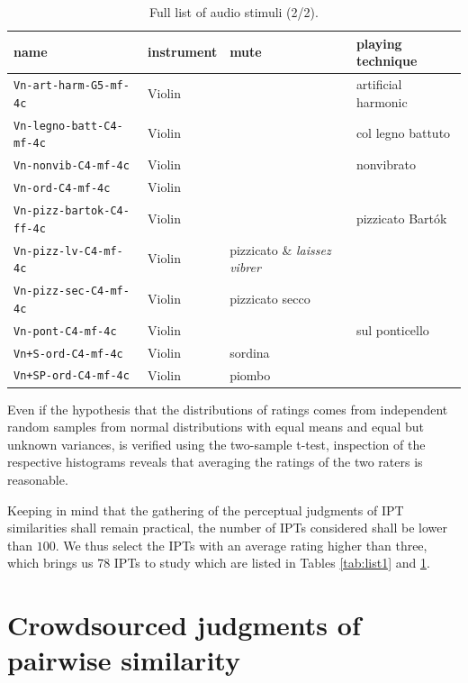 \documentclass{bmcart}
\newcommand{\ipt}{IPT\xspace}
\newcommand{\ipts}{IPTs\xspace}
\begin{document}
\begin{backmatter}
\begin{table}
  \label{tab:list2}
\caption{Full list of audio stimuli (2/2).}
\begin{tabular}{llll}
          name & instrument  & mute   &  playing technique \\ \hline \hline
          \texttt{Vn-art-harm-G5-mf-4c} & Violin & & artificial harmonic \\
          \texttt{Vn-legno-batt-C4-mf-4c} & Violin & & col legno battuto \\
          \texttt{Vn-nonvib-C4-mf-4c} & Violin & & nonvibrato \\
          \texttt{Vn-ord-C4-mf-4c} & Violin & & \\
          \texttt{Vn-pizz-bartok-C4-ff-4c} & Violin & & pizzicato Bart\'ok \\
          \texttt{Vn-pizz-lv-C4-mf-4c} & Violin & pizzicato \& \emph{laissez vibrer} \\
          \texttt{Vn-pizz-sec-C4-mf-4c} & Violin & pizzicato secco \\
          \texttt{Vn-pont-C4-mf-4c} & Violin & & sul ponticello \\
          \texttt{Vn+S-ord-C4-mf-4c} & Violin & sordina & \\
          \texttt{Vn+SP-ord-C4-mf-4c} & Violin & piombo & \\ \hline
\end{tabular}
\end{table}

Even if the hypothesis that the distributions of ratings comes from independent random samples from normal distributions with equal means and equal but unknown variances, is verified using the two-sample t-test, inspection of the respective histograms reveals that averaging the ratings of the two raters is reasonable.

Keeping in mind that the gathering of the perceptual judgments of \ipt similarities shall remain practical, the number of \ipts considered shall be lower than $100$. We thus select the \ipts with an average rating higher than three, which brings us 78 \ipts to study which are listed in Tables \ref{tab:list1} and \ref{tab:list2}.

\section*{Crowdsourced judgments of pairwise similarity}


\end{backmatter}
\end{document}
